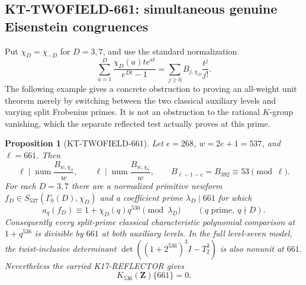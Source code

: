 \documentclass[11pt,a4paper]{article}
\newtheorem{proposition}[theorem]{Proposition}
\theoremstyle{definition}
\begin{document}


\subsection{KT-TWOFIELD-661: simultaneous genuine Eisenstein congruences}
\label{sec:kt-twofield-661}

Put $\chi_D=\chi_{-D}$ for $D=3,7$, and use the standard
normalization
\[
 \sum_{a=1}^{D}\frac{\chi_D(a)t e^{at}}{e^{Dt}-1}
       =\sum_{j\geq0}B_{j,\chi_D}\frac{t^j}{j!}.
                                                               \tag{TF.1}
\]
The following example gives a concrete obstruction to proving
an all-weight unit theorem merely by switching between the
two classical auxiliary levels and varying split Frobenius
primes. It is not an obstruction to the rational $K$-group
vanishing, which the separate reflected test actually proves
at this prime.

\begin{proposition}[KT-TWOFIELD-661]
Let $e=268$, $w=2e+1=537$, and $\ell=661$. Then
\[
 \ell\mid\operatorname{num}\frac{B_{w,\chi_3}}w,
 \qquad
 \ell\mid\operatorname{num}\frac{B_{w,\chi_7}}w,
 \qquad
 B_{\ell-1-e}=B_{392}\equiv53\pmod\ell.
                                                               \tag{TF.2}
\]
For each $D=3,7$ there are a normalized primitive newform
$f_D\in S_{537}(\Gamma_0(D),\chi_D)$ and a coefficient
prime $\lambda_D\mid661$ for which
\[
 a_q(f_D)\equiv1+\chi_D(q)q^{536}\pmod{\lambda_D}
                  \qquad(q\text{ prime},\ q\nmid D).
                                                               \tag{TF.3}
\]
Consequently every split-prime classical characteristic
polynomial comparison at $1+q^{536}$ is divisible by $661$
at both auxiliary levels. In the full level-seven model,
the twist-inclusive determinant
$\det((1+2^{536})^3I-T_2^3)$ is also nonunit at $661$.
Nevertheless the carried K17-REFLECTOR gives
\[
                         K_{536}(\mathbf Z)\{661\}=0.
                                                               \tag{TF.4}
\]
\end{proposition}
\end{document}
